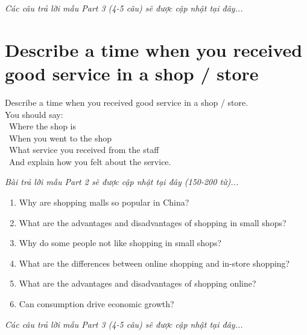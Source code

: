 \vspace{1em}
\textit{Các câu trả lời mẫu Part 3 (4-5 câu) sẽ được cập nhật tại đây...}
\vspace{2em}

\section{Describe a time when you received good service in a shop / store}
\begin{ieltsprompt}
Describe a time when you received good service in a shop / store. \\
You should say: \\
\textbullet\ Where the shop is \\
\textbullet\ When you went to the shop \\
\textbullet\ What service you received from the staff \\
\textbullet\ And explain how you felt about the service. \\
\end{ieltsprompt}

\vspace{1em}
\textit{Bài trả lời mẫu Part 2 sẽ được cập nhật tại đây (150-200 từ)...}
\vspace{2em}

\begin{ieltsprompt}
\begin{enumerate}[itemsep=4pt]
    \item Why are shopping malls so popular in China?
    \item What are the advantages and disadvantages of shopping in small shops?
    \item Why do some people not like shopping in small shops?
    \item What are the differences between online shopping and in-store shopping?
    \item What are the advantages and disadvantages of shopping online?
    \item Can consumption drive economic growth?
\end{enumerate}
\end{ieltsprompt}

\vspace{1em}
\textit{Các câu trả lời mẫu Part 3 (4-5 câu) sẽ được cập nhật tại đây...}
\vspace{2em}

